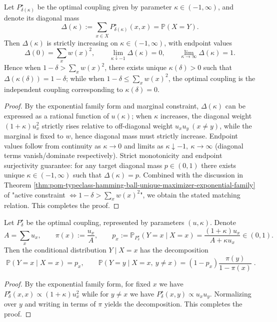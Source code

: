 \begin{theorem}\label{thm:pom-typeclass-diagonal-mass-monotone}
Let \(P^\star_{\delta(\kappa)}\) be the optimal coupling given by parameter \(\kappa\in(-1,\infty)\), and denote its diagonal mass
\[
\Delta(\kappa):=\sum_{x\in X}P^\star_{\delta(\kappa)}(x,x)=\mathbb P(X=Y).
\]
Then \(\Delta(\kappa)\) is strictly increasing on \(\kappa\in(-1,\infty)\), with endpoint values
\[
\Delta(0)=\sum_x w(x)^2,\qquad
\lim_{\kappa\downarrow-1}\Delta(\kappa)=0,\qquad
\lim_{\kappa\to\infty}\Delta(\kappa)=1.
\]
Hence when \(1-\delta>\sum_x w(x)^2\), there exists unique \(\kappa(\delta)>0\) such that \(\Delta(\kappa(\delta))=1-\delta\);
while when \(1-\delta\le \sum_x w(x)^2\), the optimal coupling is the independent coupling corresponding to \(\kappa(\delta)=0\).
\end{theorem}
\begin{proof}
By the exponential family form and marginal constraint, \(\Delta(\kappa)\) can be expressed as a rational function of \(u(\kappa)\);
when \(\kappa\) increases, the diagonal weight \((1+\kappa)u_x^2\) strictly rises relative to off-diagonal weight \(u_xu_y\ (x\neq y)\),
while the marginal is fixed to \(w\), hence diagonal mass must strictly increase.
Endpoint values follow from continuity as \(\kappa\to 0\) and limits as \(\kappa\downarrow-1,\ \kappa\to\infty\) (diagonal terms vanish/dominate respectively).
Strict monotonicity and endpoint surjectivity guarantee: for any target diagonal mass \(p\in(0,1)\) there exists unique \(\kappa\in(-1,\infty)\) such that \(\Delta(\kappa)=p\).
Combined with the discussion in Theorem \ref{thm:pom-typeclass-hamming-ball-unique-maximizer-exponential-family} of "active constraint \(\Leftrightarrow 1-\delta>\sum_x w(x)^2\)", we obtain the stated matching relation. This completes the proof.
\end{proof}

\begin{theorem}\label{thm:pom-typeclass-keep-resample-channel}
Let \(P^\star_\delta\) be the optimal coupling, represented by parameters \((u,\kappa)\).
Denote
\[
A=\sum_x u_x,\qquad \pi(x):=\frac{u_x}{A},
\qquad
p_x:=\mathbb P_{P^\star_\delta}(Y=x\mid X=x)=\frac{(1+\kappa)u_x}{A+\kappa u_x}\in(0,1).
\]
Then the conditional distribution \(Y\mid X=x\) has the decomposition
\[
\boxed{\;
\mathbb P(Y=x\mid X=x)=p_x,\qquad
\mathbb P(Y=y\mid X=x,\ y\neq x)=(1-p_x)\frac{\pi(y)}{1-\pi(x)}\; }.
\]
\end{theorem}
\begin{proof}
By the exponential family form, for fixed \(x\) we have
\(
P^\star_\delta(x,x)\propto (1+\kappa)u_x^2
\)
while for \(y\neq x\) we have
\(
P^\star_\delta(x,y)\propto u_xu_y
\).
Normalizing over \(y\) and writing in terms of \(\pi\) yields the decomposition. This completes the proof.
\end{proof}

